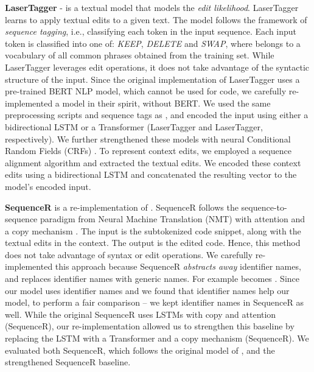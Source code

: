 \textbf{LaserTagger} \cite{malmi2019lasertagger} - is a textual model that models the \emph{edit likelihood}. LaserTagger learns to apply textual edits to a given text. The model follows the framework of \emph{sequence tagging}, i.e., classifying each token in the input sequence. Each input token is classified into one of: \emph{KEEP}, \emph{DELETE} and \emph{SWAP}, where  belongs to a vocabulary of all common phrases obtained from the training set. While LaserTagger leverages edit operations, it does not take advantage of the syntactic structure of the input. 
Since the original implementation of LaserTagger uses a pre-trained BERT NLP model, which cannot be used for code,
we carefully re-implemented a model in their spirit, without BERT. 
We used the same preprocessing scripts and sequence tags as \citet{malmi2019lasertagger}, and encoded the input using either a bidirectional LSTM or a Transformer \cite{NIPS2017_7181} (LaserTagger and LaserTagger, respectively). We further strengthened these models with neural Conditional Random Fields (CRFs) \cite{ma2016end}.
To represent context edits, we employed a sequence alignment algorithm \citep{10.1093/nar/24.14.2730} and extracted the textual edits. We encoded these context edits using 
a bidirectional LSTM
and concatenated the resulting vector to the model's encoded input. 

\textbf{SequenceR} is a re-implementation of \citet{DBLP:journals/corr/abs-1901-01808}.
SequenceR follows the sequence-to-sequence paradigm from Neural Machine Translation (NMT) with attention \citep{DBLP:journals/corr/LuongPM15} and a copy mechanism \cite{DBLP:journals/corr/GuLLL16}. The input is the subtokenized code snippet, along with the textual edits in the context. The output is the edited code. Hence, this method does not take advantage of syntax or edit operations.
We carefully re-implemented this approach because 
SequenceR \emph{abstracts away} identifier names, and replaces identifier names with generic names. For example  becomes . 
Since our model uses identifier names and we found that identifier names help our model, 
to perform a fair comparison -- we kept identifier names in SequenceR as well. 
While the original SequenceR uses LSTMs with copy and attention (SequenceR), our re-implementation allowed us to strengthen this baseline by replacing
the LSTM with a Transformer \cite{NIPS2017_7181} and a copy mechanism (SequenceR). We evaluated both SequenceR, which follows the original model of \citet{DBLP:journals/corr/abs-1901-01808}, and the strengthened SequenceR baseline. 

